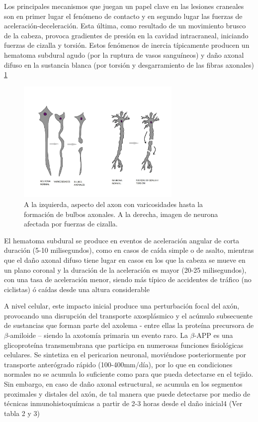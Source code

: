 Los principales mecanismos que juegan un papel clave en las lesiones craneales son en primer lugar el fenómeno de contacto y en segundo lugar las fuerzas de aceleración-deceleración\cite{Gaetz2004}. Esta última, como resultado de un movimiento brusco de la cabeza, provoca gradientes de presión en la cavidad intracraneal, iniciando fuerzas de cizalla y torsión. Estos fenómenos de inercia típicamente producen un hematoma subdural agudo (por la ruptura de vasos sanguíneos) y daño axonal difuso en la sustancia blanca (por torsión y desgarramiento de las fibras axonales) \ref{fig:figura4}

	\begin{figure}
	\centering
	\includegraphics[width=0.7\textwidth]{imagenes/Figura4}
	\caption{A la izquierda, aspecto del axon con varicosidades hasta la formación de bulbos axonales. A la derecha, imagen de neurona afectada por fuerzas de cizalla.}
	\label{fig:figura4}
\end{figure} 

El hematoma subdural se produce en eventos de aceleración angular de corta duración (5-10 milisegundos), como en casos de caída simple o de asalto, mientras que el daño axonal difuso tiene lugar en casos en los que la cabeza se mueve en un plano coronal y la duración de la aceleración es mayor (20-25 milisegundos), con una tasa de aceleración menor, siendo más típico de accidentes de tráfico (no ciclistas) ó caídas desde una altura considerable \cite{Oehmichen1998}

A nivel celular, este impacto inicial produce una perturbación focal del axón, provocando una disrupción del transporte axosplásmico y el acúmulo subsecuente de sustancias que forman parte del axolema - entre ellas la proteína precursora de $\beta$-amiloide – siendo la axotomía primaria un evento raro. La $\beta$-APP es una glicoproteína transmembrana que participa en numerosas funciones fisiológicas celulares. Se sintetiza en el pericarion neuronal, moviéndose posteriormente por transporte anterógrado rápido (100-400mm/día), por lo que en condiciones normales no se acumula lo suficiente como para que pueda detectarse en el tejido. Sin embargo, en caso de daño axonal estructural, se acumula en los segmentos proximales y distales del axón, de tal manera que puede detectarse por medio de técnicas inmunohistoquímicas a partir de 2-3 horas desde el daño inicial4 (Ver tabla 2 y 3) \cite{Hostiuc2014}

